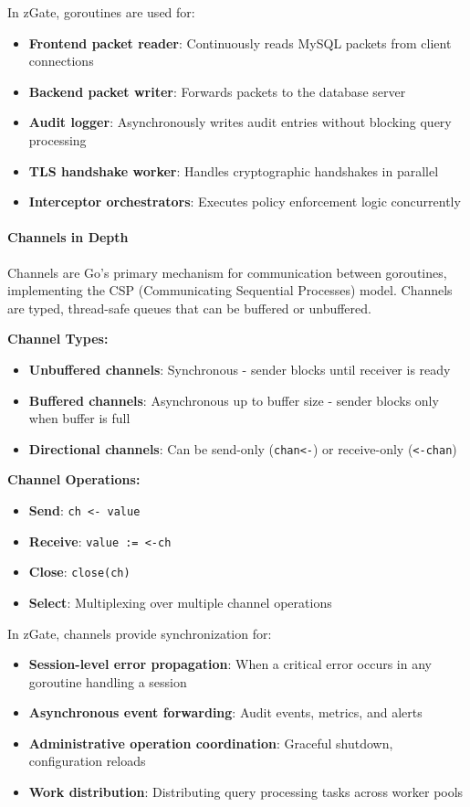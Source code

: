 In zGate, goroutines are used for:
\begin{itemize}
    \item \textbf{Frontend packet reader}: Continuously reads MySQL packets from client connections
    \item \textbf{Backend packet writer}: Forwards packets to the database server
    \item \textbf{Audit logger}: Asynchronously writes audit entries without blocking query processing
    \item \textbf{TLS handshake worker}: Handles cryptographic handshakes in parallel
    \item \textbf{Interceptor orchestrators}: Executes policy enforcement logic concurrently
\end{itemize}

\paragraph{Channels in Depth}

Channels are Go's primary mechanism for communication between goroutines, implementing the CSP (Communicating Sequential Processes) model. Channels are typed, thread-safe queues that can be buffered or unbuffered.

\textbf{Channel Types:}
\begin{itemize}
    \item \textbf{Unbuffered channels}: Synchronous - sender blocks until receiver is ready
    \item \textbf{Buffered channels}: Asynchronous up to buffer size - sender blocks only when buffer is full
    \item \textbf{Directional channels}: Can be send-only (\texttt{chan<-}) or receive-only (\texttt{<-chan})
\end{itemize}

\textbf{Channel Operations:}
\begin{itemize}
    \item \textbf{Send}: \texttt{ch <- value}
    \item \textbf{Receive}: \texttt{value := <-ch}
    \item \textbf{Close}: \texttt{close(ch)}
    \item \textbf{Select}: Multiplexing over multiple channel operations
\end{itemize}

In zGate, channels provide synchronization for:
\begin{itemize}
    \item \textbf{Session-level error propagation}: When a critical error occurs in any goroutine handling a session
    \item \textbf{Asynchronous event forwarding}: Audit events, metrics, and alerts
    \item \textbf{Administrative operation coordination}: Graceful shutdown, configuration reloads
    \item \textbf{Work distribution}: Distributing query processing tasks across worker pools
\end{itemize}

